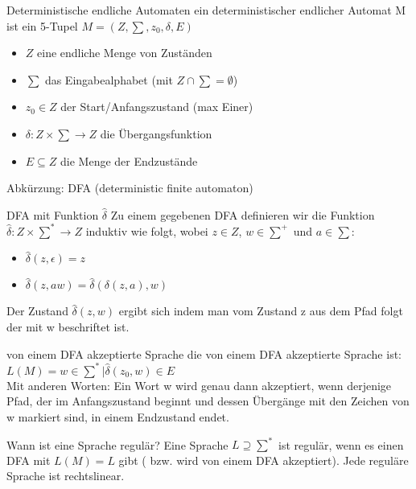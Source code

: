\documentclass[avery5371]{flashcards}
\begin{document}
\begin{flashcard}[Definition]{Deterministische endliche Automaten}
    ein deterministischer endlicher Automat M ist ein 5-Tupel $M=(Z, \sum, z_0, \delta, E)$
\begin{itemize}
    \item $Z$ eine endliche Menge von Zuständen
    \item $\sum$ das Eingabealphabet (mit $Z\cap\sum = \emptyset$)
    \item $z_0\in Z$ der Start/Anfangszustand (max Einer)
    \item $\delta: Z \times \sum \rightarrow Z$ die Übergangsfunktion
    \item $E\subseteq Z$ die Menge der Endzustände
\end{itemize}
Abkürzung: DFA (deterministic finite automaton)
\end{flashcard}

\begin{flashcard}[Definition]{DFA mit Funktion $\hat{\delta}$}
    Zu einem gegebenen DFA definieren wir die Funktion $\hat{\delta}: Z \times \sum^* \rightarrow Z$ induktiv wie folgt, wobei $z\in Z$, $w\in\sum^+$ und $a\in \sum$:
    \begin{itemize}
        \item $\hat{\delta}(z, \epsilon) = z$
        \item $\hat{\delta}(z,aw)= \hat{\delta}(\delta(z,a),w)$
    \end{itemize}
    Der Zustand $\hat{\delta}(z,w)$ ergibt sich indem man vom Zustand z aus dem Pfad folgt der mit w beschriftet ist.
\end{flashcard}

\begin{flashcard}[Definition]{von einem DFA akzeptierte Sprache}
    die von einem DFA akzeptierte Sprache ist: $L(M)={w\in\sum^* | \hat{\delta}(z_0,w)\in E}$\\
    Mit anderen Worten: Ein Wort w wird genau dann akzeptiert, wenn derjenige Pfad, der im Anfangszustand beginnt und dessen Übergänge mit den Zeichen von w markiert sind, in einem Endzustand endet.
\end{flashcard}

\begin{flashcard}[Definition]{Wann ist eine Sprache regulär?}
    Eine Sprache $L \supseteq \sum^*$ ist regulär, wenn es einen DFA mit $L(M)=L$ gibt ( bzw. wird von einem DFA akzeptiert).  Jede reguläre Sprache ist rechtslinear.
\end{flashcard}
\end{document}
